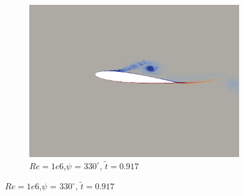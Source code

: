 \begin{figure}[H]
\begin{subfigure}[b]{0.32\textwidth}
		\includegraphics[width=1\textwidth]{figures/Vorticity_plots/Re_1m_1pt0/phase_330.png}
		\caption{$Re=1e6$,$\psi$ = $330^\circ$, $\tilde{t}=0.917$}
		\label{fig:Re_1m_1pt0_phi330}
	\end{subfigure}
	

\end{figure}

